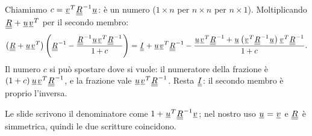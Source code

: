 \begin{dimostrazione}
 Chiamiamo $c = \vett{v}^T \matr{R}^{-1} \vett{u}$: è un numero ($1 \times n$ per $n \times n$ per
$n \times 1$). Moltiplicando $\matr{R} + \vett{u}\vett{v}^T$ per il secondo membro:
\[ \left( \matr{R} + \vett{u}\vett{v}^T \right) \left( \matr{R}^{-1} - \frac{\matr{R}^{-1} \vett{u}\vett{v}^T
   \matr{R}^{-1}}{1 + c} \right) = \matr{I} + \vett{u}\vett{v}^T \matr{R}^{-1} - \frac{\vett{u}\vett{v}^T \matr{R}^{-1} +
   \vett{u} \left( \vett{v}^T \matr{R}^{-1} \vett{u} \right) \vett{v}^T \matr{R}^{-1}}{1 + c} . \]
 Il numero $c$ si può spostare dove si vuole: il numeratore della frazione è $(1 + c)\,
\vett{u}\vett{v}^T \matr{R}^{-1}$, e la frazione vale $\vett{u}\vett{v}^T \matr{R}^{-1}$. Resta $\matr{I}$: il secondo
membro è proprio l'inversa.
\end{dimostrazione}

Le slide scrivono il denominatore come $1 + \vett{u}^T \matr{R}^{-1} \vett{v}$; nel nostro uso $\vett{u} = \vett{v}$ e
$\matr{R}$ è simmetrica, quindi le due scritture coincidono.


